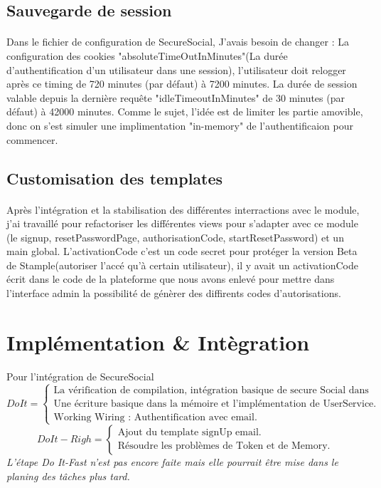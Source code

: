 \subsection{Sauvegarde de session}
\paragraph{}
Dans le fichier de configuration de SecureSocial, J'avais besoin de changer : La configuration des cookies "absoluteTimeOutInMinutes"(La durée d'authentification d'un utilisateur dans une session), l'utilisateur doit relogger après ce timing de 720 minutes (par défaut) à 7200 minutes.
La durée de session valable depuis la dernière requête  "idleTimeoutInMinutes" de 30 minutes (par défaut) à 42000 minutes.
Comme le sujet, l'idée est de limiter les partie amovible, donc on s'est simuler une implimentation "in-memory" de l'authentificaion pour commencer.
\subsection{Customisation des templates}
\paragraph{}
Après l'intégration et la stabilisation des différentes interractions avec le module, j'ai travaillé pour refactoriser les différentes views pour s'adapter avec ce module (le signup, resetPasswordPage, authorisationCode, startResetPassword) et un main global.
L'activationCode c'est un code secret pour protéger la version Beta de Stample(autoriser l'accé qu'à certain utilisateur), il y avait un activationCode écrit dans le code de la plateforme que nous avons enlevé pour mettre dans l'interface admin la possibilité de génèrer des diffirents codes d'autorisations.
\section{Implémentation \& Intègration}
Pour l'intégration de SecureSocial 
\[
Do It =
\begin{cases}
\text{La vérification de compilation, intégration basique de secure Social dans Stample.}\\
\text{Une écriture basique dans la mémoire et l'implémentation de UserService.}\\
\text{Working Wiring : Authentification avec email.}
\end{cases}
\]
\[
Do It-Righ =
\begin{cases}
\text{Ajout du template signUp email.}\\
\text{Résoudre les problèmes de Token et de Memory.}
\end{cases}
\]
\textit{L'étape Do It-Fast n'est pas encore faite mais elle pourrait être mise dans le planing des tâches plus tard. }
